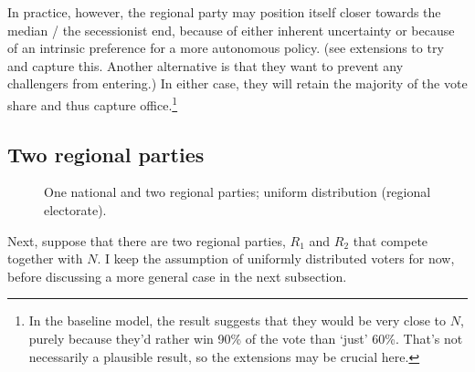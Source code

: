 \documentclass[11pt]{article}
\begin{document}
In practice, however, the regional party may position itself closer towards the median / the secessionist end, because of either inherent uncertainty or because of an intrinsic preference for a more autonomous policy. (see extensions to try and capture this. Another alternative is that they want to prevent any challengers from entering.) In either case, they will retain the majority of the vote share and thus capture office.\footnote{In the baseline model, the result suggests that they would be very close to $N$, purely because they'd rather win 90\% of the vote than `just' 60\%. That's not necessarily a plausible result, so the extensions may be crucial here.}

\subsection{Two regional parties}

\begin{figure}[ht]
    \centering 
     \caption{One national and two regional parties; uniform distribution (regional electorate).} \label{fig:mod1}
 \end{figure}

Next, suppose that there are two regional parties, $R_1$ and $R_2$ that compete together with $N$. I keep the assumption of uniformly distributed voters for now, before discussing a more general case in the next subsection.
\end{document}
